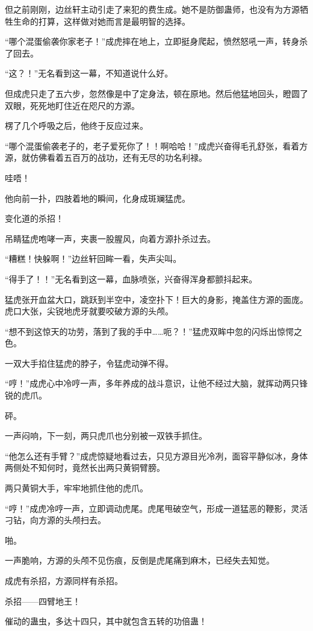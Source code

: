 \begin{this_body}
但之前刚刚，边丝轩主动引走了来犯的费生成。她不是防御蛊师，也没有为方源牺牲生命的打算，这样做对她而言是最明智的选择。

“哪个混蛋偷袭你家老子！”成虎摔在地上，立即挺身爬起，愤然怒吼一声，转身杀了回去。

“这？！”无名看到这一幕，不知道说什么好。

但成虎只走了五六步，忽然像是中了定身法，顿在原地。然后他猛地回头，瞪圆了双眼，死死地盯住近在咫尺的方源。

楞了几个呼吸之后，他终于反应过来。

“哪个混蛋偷袭老子的，老子爱死你了！！啊哈哈！”成虎兴奋得毛孔舒张，看着方源，就仿佛看着五百万的战功，还有无尽的功名利禄。

哇唔！

他向前一扑，四肢着地的瞬间，化身成斑斓猛虎。

变化道的杀招！

吊睛猛虎咆哮一声，夹裹一股腥风，向着方源扑杀过去。

“糟糕！快躲啊！”边丝轩回眸一看，失声尖叫。

“得手了！！”无名看到这一幕，血脉喷张，兴奋得浑身都颤抖起来。

猛虎张开血盆大口，跳跃到半空中，凌空扑下！巨大的身影，掩盖住方源的面庞。虎口大张，尖锐地虎牙就要咬破方源的头颅。

“想不到这惊天的功劳，落到了我的手中……呃？！”猛虎双眸中忽的闪烁出惊愕之色。

一双大手掐住猛虎的脖子，令猛虎动弹不得。

“哼！”成虎心中冷哼一声，多年养成的战斗意识，让他不经过大脑，就挥动两只锋锐的虎爪。

砰。

一声闷响，下一刻，两只虎爪也分别被一双铁手抓住。

“他怎么还有手臂？”成虎惊疑地看过去，只见方源目光冷冽，面容平静似冰，身体两侧处不知何时，竟然长出两只黄铜臂膀。

两只黄铜大手，牢牢地抓住他的虎爪。

“哼！”成虎冷哼一声，立即调动虎尾。虎尾甩破空气，形成一道猛恶的鞭影，灵活刁钻，向方源的头颅扫去。

啪。

一声脆响，方源的头颅不见伤痕，反倒是虎尾痛到麻木，已经失去知觉。

成虎有杀招，方源同样有杀招。

杀招——四臂地王！

催动的蛊虫，多达十四只，其中就包含五转的功倍蛊！


\end{this_body}
